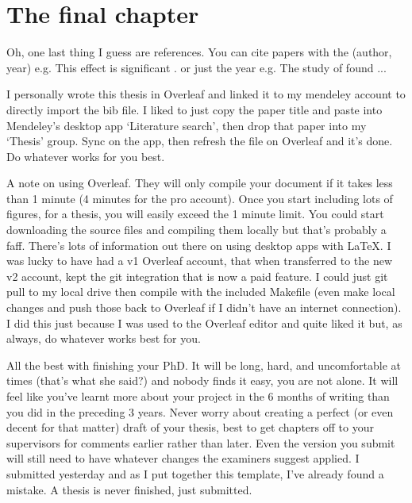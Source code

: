 \chapter[The final chapter]{The final chapter}
\label{ch:conclusions_futurework}

Oh, one last thing I guess are references. You can cite papers with the (author, year) e.g. This effect is significant \citep{Davies2015}. or just the year e.g. The study of \citet{Mound2019RegionalVariations} found ...

I personally wrote this thesis in Overleaf and linked it to my mendeley account to directly import the bib file. I liked to just copy the paper title and paste into Mendeley's desktop app `Literature search', then drop that paper into my `Thesis' group. Sync on the app, then refresh the file on Overleaf and it's done. Do whatever works for you best.

A note on using Overleaf. They will only compile your document if it takes less than 1 minute (4 minutes for the pro account). Once you start including lots of figures, for a thesis, you will easily exceed the 1 minute limit. You could start downloading the source files and compiling them locally but that's probably a faff. There's lots of information out there on using desktop apps with \LaTeX. I was lucky to have had a v1 Overleaf account, that when transferred to the new v2 account, kept the git integration that is now a paid feature. I could just git pull to my local drive then compile with the included Makefile (even make local changes and push those back to Overleaf if I didn't have an internet connection). I did this just because I was used to the Overleaf editor and quite liked it but, as always, do whatever works best for you.

All the best with finishing your PhD. It will be long, hard, and uncomfortable at times (that's what she said?) and nobody finds it easy, you are not alone. It will feel like you've learnt more about your project in the 6 months of writing than you did in the preceding 3 years. Never worry about creating a perfect (or even decent for that matter) draft of your thesis, best to get chapters off to your supervisors for comments earlier rather than later. Even the version you submit will still need to have whatever changes the examiners suggest applied. I submitted yesterday and as I put together this template, I've already found a mistake. A thesis is never finished, just submitted.